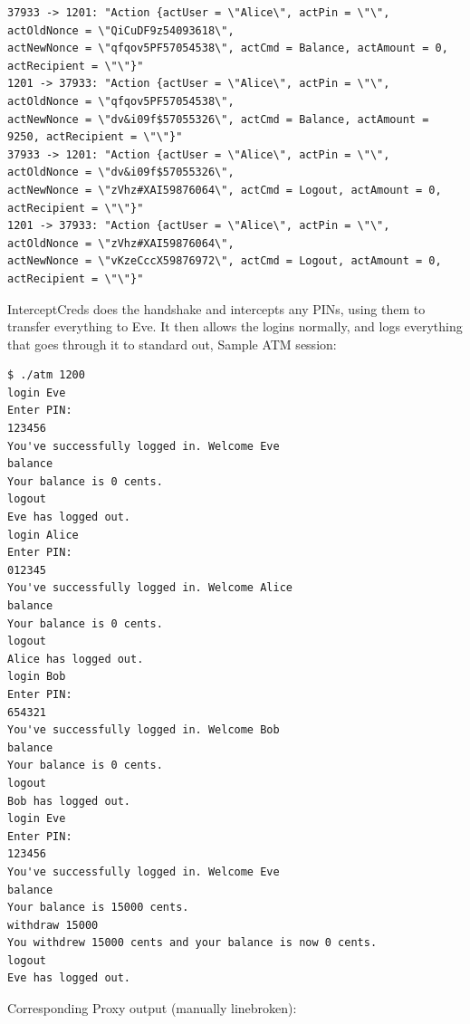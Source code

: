 \documentclass[12pt]{article}
\begin{document}
\begin{Verbatim}[frame=single,fontsize=\scriptsize]
37933 -> 1201: "Action {actUser = \"Alice\", actPin = \"\", actOldNonce = \"QiCuDF9z54093618\", 
actNewNonce = \"qfqov5PF57054538\", actCmd = Balance, actAmount = 0, actRecipient = \"\"}"
1201 -> 37933: "Action {actUser = \"Alice\", actPin = \"\", actOldNonce = \"qfqov5PF57054538\", 
actNewNonce = \"dv&i09f$57055326\", actCmd = Balance, actAmount = 9250, actRecipient = \"\"}"
37933 -> 1201: "Action {actUser = \"Alice\", actPin = \"\", actOldNonce = \"dv&i09f$57055326\", 
actNewNonce = \"zVhz#XAI59876064\", actCmd = Logout, actAmount = 0, actRecipient = \"\"}"
1201 -> 37933: "Action {actUser = \"Alice\", actPin = \"\", actOldNonce = \"zVhz#XAI59876064\", 
actNewNonce = \"vKzeCccX59876972\", actCmd = Logout, actAmount = 0, actRecipient = \"\"}"
\end{Verbatim}
InterceptCreds does the handshake and intercepts any PINs, using them to transfer everything to Eve.
It then allows the logins normally, and logs everything that goes through it to standard out,
Sample ATM session:
\begin{Verbatim}[frame=single,fontsize=\scriptsize]
$ ./atm 1200
login Eve
Enter PIN:
123456
You've successfully logged in. Welcome Eve
balance
Your balance is 0 cents.
logout
Eve has logged out.
login Alice
Enter PIN:
012345
You've successfully logged in. Welcome Alice
balance
Your balance is 0 cents.
logout
Alice has logged out.
login Bob
Enter PIN:
654321
You've successfully logged in. Welcome Bob
balance
Your balance is 0 cents.
logout
Bob has logged out.
login Eve
Enter PIN:
123456
You've successfully logged in. Welcome Eve
balance
Your balance is 15000 cents.
withdraw 15000
You withdrew 15000 cents and your balance is now 0 cents.
logout
Eve has logged out.
\end{Verbatim}
Corresponding Proxy output (manually linebroken):
\end{document}
